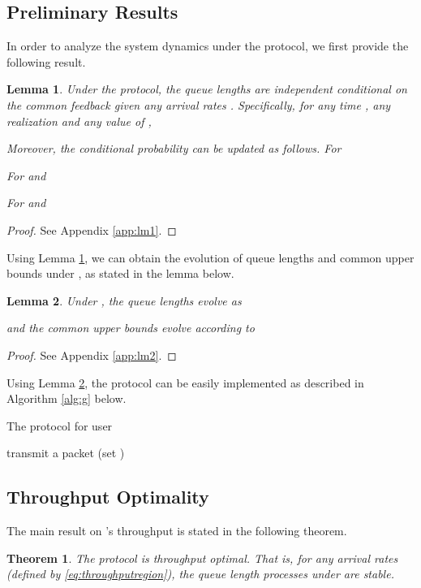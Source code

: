 \documentclass[onecolumn,draftcls]{IEEEtran}
\newtheorem{theorem}{Theorem}
\newtheorem{lemma}{Lemma}
\begin{document}
\subsection{Preliminary Results}
In order to analyze the system dynamics under the  protocol, we first provide the following result.
\begin{lemma}
\label{lm:conditional_indep}
Under the  protocol,
the queue lengths are independent conditional on the common feedback given any arrival rates .
Specifically, for any time , any realization  and any value  of ,

Moreover, the conditional probability can be updated as follows.
For 

For  and 

For  and 



\end{lemma}
\begin{proof}
See Appendix \ref{app:lm1}.
\end{proof}


Using Lemma \ref{lm:conditional_indep}, we can obtain the evolution of queue lengths and common upper bounds under , as stated in the lemma below.
\begin{lemma}
\label{lm:evolution}
Under , the queue lengths evolve as

and the common upper bounds evolve according to

\end{lemma}
\begin{proof}
See Appendix \ref{app:lm2}.
\end{proof}
Using Lemma \ref{lm:evolution},
the  protocol can be easily implemented as described in Algorithm \ref{alg:g} below.
\begin{algorithm}[H]
\caption{The  protocol for user }
\label{alg:g}
\begin{algorithmic}
\STATE 
\ENDFOR

\STATE 
\STATE 
{}
\STATE transmit a packet (set )
\ENDIF


\FOR{}
\STATE 
\ENDFOR

\IF{}
\STATE  
\ELSE
\STATE  
\ENDIF
\ENDWHILE
\end{algorithmic}
\end{algorithm}

\subsection{Throughput Optimality} \label{sub:throughput}
The main result on 's throughput is stated in the following theorem.
\begin{theorem}
\label{thm:throughput_optimal}
The  protocol is throughput optimal.
That is, for any arrival rates  (defined by \eqref{eq:throughputregion}),
the queue length processes under  are stable.
\end{theorem}
\end{document}
